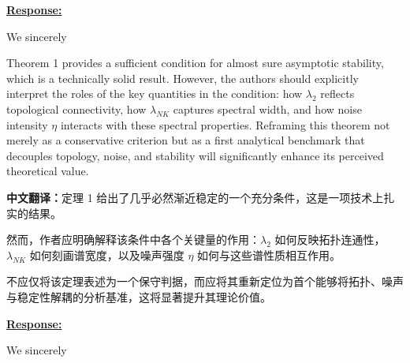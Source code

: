 \documentclass[a4paper,12pt]{article}
\newcommand{\zhtranslationfirst}[1]{%
    \par\medskip\noindent
    {\small\color{blue!60!black}\textbf{中文翻译：}#1}\par
}
\newcommand{\zhtranslation}[1]{%
    \par\smallskip\noindent
    {\small\color{blue!60!black}#1}\par
}
\begin{document}
\noindent \underline {\textbf{Response:}}
\bigskip

We sincerely
%

\newpage
\begin{tcolorbox}[title = {Comment 5},fonttitle = \bfseries]
    Theorem 1 provides a sufficient condition for almost sure asymptotic stability, which is a technically solid result. However, the authors should explicitly interpret the roles of the key quantities in the condition: how $\lambda_2$ reflects topological connectivity, how $\lambda_{NK}$ captures spectral width, and how noise intensity $\eta$ interacts with these spectral properties. Reframing this theorem not merely as a conservative criterion but as a first analytical benchmark that decouples topology, noise, and stability will significantly enhance its perceived theoretical value.
    \zhtranslationfirst{定理 1 给出了几乎必然渐近稳定的一个充分条件，这是一项技术上扎实的结果。}
    \zhtranslation{然而，作者应明确解释该条件中各个关键量的作用：$\lambda_2$ 如何反映拓扑连通性，$\lambda_{NK}$ 如何刻画谱宽度，以及噪声强度 $\eta$ 如何与这些谱性质相互作用。}
    \zhtranslation{不应仅将该定理表述为一个保守判据，而应将其重新定位为首个能够将拓扑、噪声与稳定性解耦的分析基准，这将显著提升其理论价值。}
\end{tcolorbox}

\noindent \underline {\textbf{Response:}}
\bigskip

We sincerely
\end{document}
